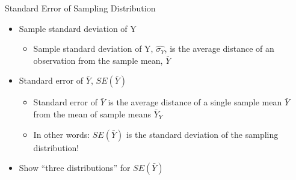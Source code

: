 \documentclass[
  8pt,
  ignorenonframetext,
  dvipsnames]{beamer}
\providecommand{\tightlist}{%
  \setlength{\itemsep}{0pt}\setlength{\parskip}{0pt}}
\let\olditem\item
\renewcommand{\item}{%
  \olditem\vspace{4pt}
}
\begin{document}
\begin{frame}{Standard Error of Sampling Distribution}
\protect\hypertarget{standard-error-of-sampling-distribution}{}

\begin{itemize}
\tightlist
\item
  Sample standard deviation of Y

  \begin{itemize}
  \tightlist
  \item
    Sample standard deviation of Y, \(\hat{\sigma_Y}\), is the average
    distance of an observation from the sample mean, \(\bar{Y}\)
  \end{itemize}
\end{itemize}

\medskip

\begin{itemize}
\tightlist
\item
  Standard error of \(\bar{Y}\), \(SE(\bar{Y})\)

  \begin{itemize}
  \tightlist
  \item
    Standard error of \(\bar{Y}\) is the average distance of a single
    sample mean \(\bar{Y}\) from the mean of sample means \(\bar{Y}_Y\)
  \item
    In other words: \(SE(\bar{Y})\) is the standard deviation of the
    sampling distribution!
  \end{itemize}
\end{itemize}

\medskip

\begin{itemize}
\tightlist
\item
  Show ``three distributions'' for \(SE(\bar{Y})\)
\end{itemize}

\medskip

\end{frame}
\end{document}
